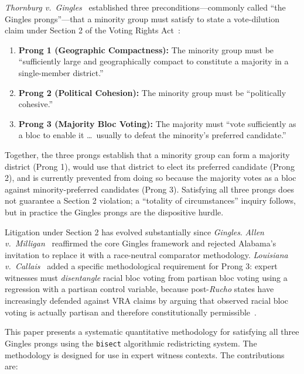 \label{sec:introduction}

\textit{Thornburg v.\ Gingles}~\citep{gingles1986} established three
preconditions---commonly called ``the Gingles prongs''---that a minority
group must satisfy to state a vote-dilution claim under Section 2 of the
Voting Rights Act~\citep{vra1965}:

\begin{enumerate}
  \item \textbf{Prong 1 (Geographic Compactness):} The minority group must be
    ``sufficiently large and geographically compact to constitute a majority
    in a single-member district.''
  \item \textbf{Prong 2 (Political Cohesion):} The minority group must be
    ``politically cohesive.''
  \item \textbf{Prong 3 (Majority Bloc Voting):} The majority must ``vote
    sufficiently as a bloc to enable it \ldots\ usually to defeat the
    minority's preferred candidate.''
\end{enumerate}

Together, the three prongs establish that a minority group can form a
majority district (Prong 1), would use that district to elect its preferred
candidate (Prong 2), and is currently prevented from doing so because the
majority votes as a bloc against minority-preferred candidates (Prong 3).
Satisfying all three prongs does not guarantee a Section 2 violation; a
``totality of circumstances'' inquiry follows, but in practice the Gingles
prongs are the dispositive hurdle.

Litigation under Section 2 has evolved substantially since \textit{Gingles}.
\textit{Allen v.\ Milligan}~\citep{allen2023} reaffirmed the core Gingles
framework and rejected Alabama's invitation to replace it with a race-neutral
comparator methodology.  \textit{Louisiana v.\ Callais}~\citep{callais2026}
added a specific methodological requirement for Prong 3: expert witnesses must
\emph{disentangle} racial bloc voting from partisan bloc voting using a
regression with a partisan control variable, because post-\textit{Rucho}
states have increasingly defended against VRA claims by arguing that observed
racial bloc voting is actually partisan and therefore constitutionally
permissible~\citep{rucho2019}.

This paper presents a systematic quantitative methodology for satisfying all
three Gingles prongs using the \texttt{bisect} algorithmic redistricting
system.  The methodology is designed for use in expert witness contexts.
The contributions are:

